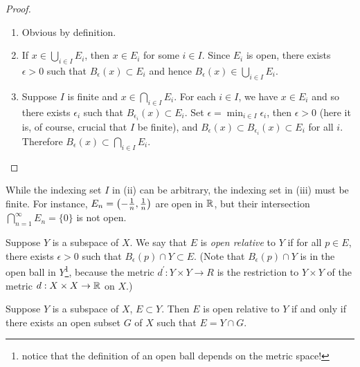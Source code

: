 \begin{proof} \
\begin{enumerate}[label=(\roman*)]
\item Obvious by definition.
\item If $x\in\bigcup_{i\in I}E_i$, then $x\in E_i$ for some $i\in I$. Since $E_i$ is open, there exists $\epsilon>0$ such that $B_\epsilon(x)\subset E_i$ and hence $ B_\epsilon(x)\in\bigcup_{i\in I}E_i$.
\item Suppose $I$ is finite and $x\in\bigcap_{i\in I}E_i$. For each $i\in I$, we have $x\in E_i$ and so there exists $\epsilon_i$ such that $B_{\epsilon_i}(x)\subset E_i$. Set $\epsilon=\min_{i\in I}\epsilon_i$, then $\epsilon>0$ (here it is, of course, crucial that $I$ be finite), and $B_\epsilon(x)\subset B_{\epsilon_i}(x)\subset E_i$ for all $i$. Therefore $ B_\epsilon(x)\subset\bigcap_{i\in I}E_i$.
\end{enumerate}
\end{proof}

\begin{remark}
While the indexing set $I$ in (ii) can be arbitrary, the indexing set in (iii) must be finite. For instance, $E_n=\left(-\frac{1}{n},\frac{1}{n}\right)$ are open in $\mathbb R$, but their intersection $\bigcap_{n=1}^\infty E_n=\{0\}$ is not open.
\end{remark}

Suppose $Y$ is a subspace of $X$. We say that $E$ is \emph{open relative} to $Y$ if for all $p\in E$, there exists $\epsilon>0$ such that $B_\epsilon(p)\cap Y\subset E$. (Note that $B_\epsilon(p)\cap Y$ is in the open ball in $Y$\footnote{notice that the definition of an open ball depends on the metric space!}, because the metric $d^\prime:Y\times Y\to R$ is the restriction to $Y\times Y$ of the metric $d:X\times X\to\mathbb R$ on $X$.)

\begin{proposition}\label{prop:open-subspace-cap}
Suppose $Y$ is a subspace of $X$, $E\subset Y$. Then $E$ is open relative to $Y$ if and only if there exists an open subset $G$ of $X$ such that $E=Y\cap G$.
\end{proposition}

